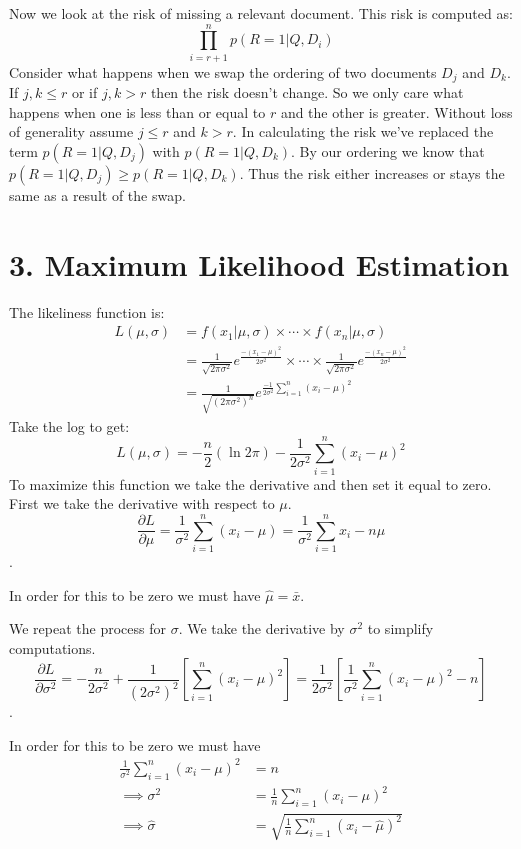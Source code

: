 \documentclass[paper=a4, fontsize=11pt]{jhwhw} %
\begin{document}
Now we look at the risk of missing a relevant document. This risk is computed as:
$$\prod_{i=r+1}^{n} p(R = 1|Q, D_i)$$
Consider what happens when we swap the ordering of two documents $D_j$ and $D_k$. If $j, k \le r$ or if $j, k > r$ then the risk doesn't change. So we only care what happens when one is less than or equal to $r$ and the other is greater. Without loss of generality assume $j \le r$ and $k > r$. In calculating the risk we've replaced the term $p(R = 1|Q, D_j)$ with $p(R = 1| Q, D_k)$. By our ordering we know that $p(R = 1|Q, D_j) \ge p(R = 1|Q, D_k)$. Thus the risk either increases or stays the same as a result of the swap.
\section*{3. Maximum Likelihood Estimation}
\solution
The likeliness function is:
\begin{align*}
    L(\mu, \sigma) &= f(x_1|\mu, \sigma) \times \cdots \times f(x_n|\mu, \sigma)\\
                   &= \frac{1}{\sqrt{2\pi\sigma^2}}e^{\frac{-(x_1 - \mu)^2}{2\sigma^2}} \times \cdots \times \frac{1}{\sqrt{2\pi\sigma^2}}e^{\frac{-(x_n - \mu)^2}{2\sigma^2}}\\
                   &= \frac{1}{\sqrt{(2\pi\sigma^2)^n}}e^{\frac{-1}{2\sigma^2}\sum_{i=1}^{n}(x_i - \mu)^2}
\end{align*}
Take the log to get:
$$L(\mu, \sigma) = -\frac{n}{2}(\ln{2\pi}) - \frac{1}{2\sigma^2}\sum_{i=1}^{n}(x_i - \mu)^2$$
To maximize this function we take the derivative and then set it equal to zero. First we take the derivative with respect to $\mu$. 
$$\frac{\partial L}{\partial \mu} = \frac{1}{\sigma^2}\sum_{i=1}^{n}(x_i - \mu) = \frac{1}{\sigma^2}\sum_{i=1}^{n}x_i - n\mu$$.

In order for this to be zero we must have $\hat\mu = \bar{x}$.

We repeat the process for $\sigma$. We take the derivative by $\sigma^2$ to simplify computations. 
$$\frac{\partial L}{\partial \sigma^2} = -\frac{n}{2\sigma^2} + \frac{1}{(2\sigma^2)^2}[\sum_{i=1}^{n}(x_i - \mu)^2] = \frac{1}{2\sigma^2}[\frac{1}{\sigma^2}\sum_{i=1}^{n}(x_i - \mu)^2 - n]$$.

In order for this to be zero we must have
\begin{align*}
    \frac{1}{\sigma^2}\sum_{i=1}^{n}(x_i - \mu)^2 &= n\\
    \implies \sigma^2 &= \frac{1}{n}\sum_{i=1}^{n}(x_i - \mu)^2\\
    \implies \hat\sigma &= \sqrt{\frac{1}{n}\sum_{i=1}^{n}(x_i - \hat\mu)^2}
\end{align*}
\end{document}
